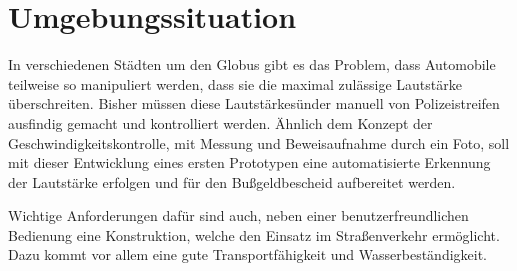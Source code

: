 \section{Umgebungssituation}

In verschiedenen Städten um den Globus gibt es das Problem, dass Automobile teilweise so manipuliert werden, dass sie die maximal zulässige Lautstärke überschreiten. Bisher müssen diese Lautstärkesünder manuell von Polizeistreifen ausfindig gemacht und kontrolliert werden. Ähnlich dem Konzept der Geschwindigkeitskontrolle, mit Messung und Beweisaufnahme durch ein Foto, soll mit dieser Entwicklung eines ersten Prototypen eine automatisierte Erkennung der Lautstärke erfolgen und für den Bußgeldbescheid aufbereitet werden.

Wichtige Anforderungen dafür sind auch, neben einer benutzerfreundlichen Bedienung eine Konstruktion, welche den Einsatz im Straßenverkehr ermöglicht. Dazu kommt vor allem eine gute Transportfähigkeit und Wasserbeständigkeit.

\newpage